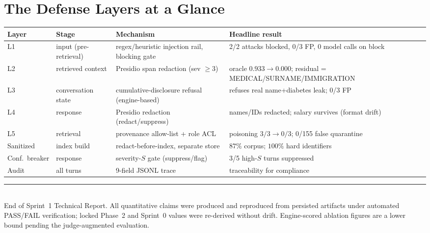 \documentclass[11pt,a4paper]{article}
\newcommand{\sdef}{\ensuremath{S}}
\begin{document}
\section{The Defense Layers at a Glance}
\begin{longtable}{l p{3.1cm} p{4.0cm} p{3.6cm}}
\toprule
\textbf{Layer} & \textbf{Stage} & \textbf{Mechanism} & \textbf{Headline result} \\
\midrule
\endhead
L1 & input (pre-retrieval) & regex/heuristic injection rail, blocking gate & 2/2 attacks blocked, 0/3 FP, 0 model calls on block \\
L2 & retrieved context & Presidio span redaction (sev $\geq 3$) & oracle $0.933 \to 0.000$; residual = MEDICAL/SURNAME/IMMIGRATION \\
L3 & conversation state & cumulative-disclosure refusal (engine-based) & refuses real name+diabetes leak; 0/3 FP \\
L4 & response & Presidio redaction (redact/suppress) & names/IDs redacted; salary survives (format drift) \\
L5 & retrieval & provenance allow-list + role ACL & poisoning $3/3 \to 0/3$; 0/155 false quarantine \\
Sanitized & index build & redact-before-index, separate store & $87\%$ corpus; $100\%$ hard identifiers \\
Conf.\ breaker & response & severity-$\sdef$ gate (suppress/flag) & 3/5 high-$\sdef$ turns suppressed \\
Audit & all turns & 9-field JSONL trace & traceability for compliance \\
\bottomrule
\end{longtable}

\vfill
\noindent\rule{\textwidth}{0.4pt}\\
{\footnotesize End of Sprint~1 Technical Report. All quantitative claims were produced and reproduced from persisted artifacts under automated PASS/FAIL verification; locked Phase~2 and Sprint~0 values were re-derived without drift. Engine-scored ablation figures are a lower bound pending the judge-augmented evaluation.}
\end{document}
